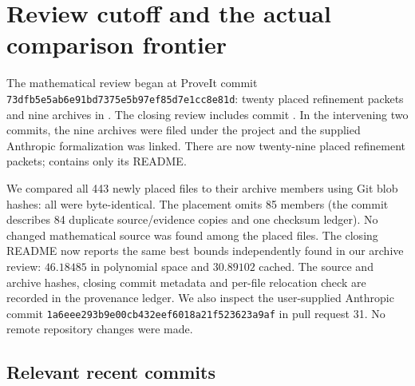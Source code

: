\section{Review cutoff and the actual comparison frontier}
\label{sec:review}

The mathematical review began at ProveIt commit
\texttt{73dfb5e5ab6e91bd7375e5b97ef85d7e1cc8e81d}: twenty placed
refinement packets and nine archives in . The closing
review includes commit \pin. In the intervening two commits, the nine
archives were filed under the project and the supplied Anthropic
formalization was linked. There are now twenty-nine placed refinement
packets;  contains only its README.

We compared all 443 newly placed files to their archive members using Git
blob hashes: all were byte-identical. The placement omits 85 members
(the commit describes 84 duplicate source/evidence copies and one checksum
ledger). No changed mathematical source was found among the placed files.
The closing README now reports the same best bounds independently found
in our archive review: $46.18485$ in polynomial space and $30.89102$ cached.
The source and archive hashes, closing commit metadata and per-file
relocation check are recorded in the provenance ledger. We also inspect the
user-supplied Anthropic commit
\texttt{1a6eee293b9e00cb432eef6018a21f523623a9af} in pull request 31.
No remote repository changes were made.

\subsection{Relevant recent commits}

